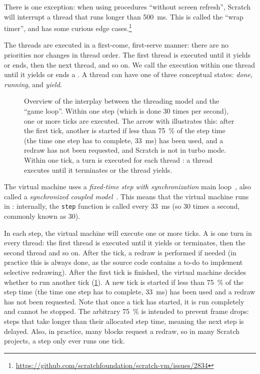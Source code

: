 \documentclass[../main]{subfiles}
\begin{document}
There is one exception: when using procedures ``without screen refresh'', Scratch will interrupt a thread that runs longer than \qty{500}{\milli\second}.
This is called the ``wrap timer'', and has some curious edge cases.\footnote{\url{https://github.com/scratchfoundation/scratch-vm/issues/2834}}

The threads are executed in a first-come, first-serve manner: there are no priorities nor changes in thread order.
The first thread is executed until it yields or ends, then the next thread, and so on.
We call the execution within one thread until it yields or ends a .
A thread can have one of three conceptual states: \emph{done}, \emph{running}, and \emph{yield}.

\begin{figure}
    \centering
    
    \caption{Overview of the interplay between the threading model and the ``game loop''. Within one step (which is done 30 times per second), one or more ticks are executed. The arrow with  illustrates this: after the first tick, another is started if less than \qty{75}{\percent} of the step time (the time one step has to complete, \qty{33}{\milli\second}) has been used, and a redraw has not been requested, and Scratch is not in turbo mode. Within one tick, a turn is executed for each thread : a thread executes until it terminates or the thread yields.}
    \label{fig:scratch-model-explained}
\end{figure}

The virtual machine uses a \emph{fixed-time step with synchronization} main loop~\autocite{nystromGameProgrammingPatterns2014}, also called a \emph{synchronized coupled model}~\autocite{valenteRealTimeGame2005}.
This means that the virtual machine runs in : internally, the \texttt{step} function is called every \qty{33}{\milli\second} (so 30 times a second, commonly known as \qty{30}{\fps}).

In each step, the virtual machine will execute one or more ticks.
A  is one turn in every thread: the first thread is executed until it yields or terminates, then the second thread and so on.
After the tick, a redraw is performed if needed (in practice this is always done, as the source code contains a to-do to implement selective redrawing).
After the first tick is finished, the virtual machine decides whether to run another tick (\cref{fig:scratch-model-explained}).
A new tick is started if less than \qty{75}{\percent} of the step time (the time one step has to complete, \qty{33}{\milli\second}) has been used and a redraw has not been requested.
Note that once a tick has started, it is run completely and cannot be stopped.
The arbitrary \qty{75}{\percent} is intended to prevent frame drops: steps that take longer than their allocated step time, meaning the next step is delayed.
Also, in practice, many blocks request a redraw, so in many Scratch projects, a step only ever runs one tick.
\end{document}
